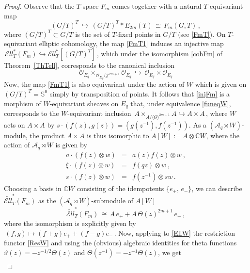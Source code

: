 \documentclass[11pt]{amsart}
\theoremstyle{definition}
\theoremstyle{remark}
\numberwithin{equation}{section}
\newcommand{\la}{\label}
\newcommand{\into}{\hookrightarrow}
\def\bS{\mathbb S}
\def\c{\mathbb{C}}
\def\A{\mathcal{A}}
\def\O{\mathcal{O}}
\def\Ell{\mathcal{E}{ll}}
\begin{document}
\begin{proof}
Observe that the $T$-space $ F_m $  comes together with a natural $T$-equivariant map
%
\begin{equation}
\la{FmT1}
 (G/T)^T \,\into\, (G/T)^T \ast E_{2m}(T)\,\cong\, F_m(G,T)\,,   
\end{equation}
%
where $(G/T)^T \subset G/T $ is the set of $T$-fixed points in $G/T$ (see \eqref{FmT}). On $T$-equivariant elliptic cohomology, the map \eqref{FmT1} induces an injective map $\,\Ell_T^*(F_m) \into \Ell^*_T [(G/T)^T]\,$, which under the isomorphism \eqref{cohFm} of Theorem~\ref{ThTell}, corresponds to the canonical inclusion
%
\begin{equation}
\la{injFm}
 \O_{E_q} \times_{\O_{E_q}/{\mathcal J}^{2m+1}}  \O_{E_q} \,\into\, \O_{E_q} \times \O_{E_q} 
\end{equation}
%
Now, the map \eqref{FmT1} is also equivariant under the action of $W$ which is given on $ (G/T)^T = \bS^0 $  simply by transposition of points.
It follows that \eqref{injFm} is a morphism of $W$-equivariant sheaves on $E_q$ that, under equivalence
\eqref{funeqW}, corresponds to the $W$-equivariant inclusion
$\,A \times_{A/\langle \Theta\rangle^{2m+1} } A \into A \times A \,$, where $W$ acts on $A \times A$ by
$s \cdot (f(z), g(z)) =  (g(z^{-1}), f(z^{-1}))$.
As a $ (\A_q \rtimes W)$-module, the product $ A \times A $ is thus isomorphic to 
$ A[W] := A \otimes \c W $, where the action of $\A_q \rtimes W$ is given by
%
\begin{eqnarray}\la{relAW}
a \cdot (f(z) \otimes w) &=& 
a(z)f(z) \otimes w\ ,\nonumber\\
\xi \cdot (f(z) \otimes w) &=& f(qz) \otimes w\ ,\\
s \cdot (f(z) \otimes w) &=& f(z^{-1}) \otimes sw\,.\nonumber
\end{eqnarray}
%
Choosing a basis in $\c W$ consisting of the idempotents $ \{e_+,\, e_{-}\}$, we can describe $ \widetilde{\Ell}_T^*(F_m) $ as the $(\A_q \rtimes W)$-submodule of $A[W]$ 
%
\begin{equation}
\la{EllW}
 \widetilde{\Ell}_T^* (F_m) \,\cong\, A \,e_{+} + A \,\Theta(z)^{2m+1}\, e_{-}\,, 
\end{equation}
%
where the isomorphism is explicitly given by $\,(f,g) \mapsto (f+g) e_{+} + (f-g) e_{-} \,$. Now, applying to \eqref{EllW} the restriction functor \eqref{ResW} and using the (obvious) algebraic
identities for theta functions $\vartheta(z)= - z^{-1/2} \Theta(z)$ and $\Theta(z^{-1}) = - z^{-1} \Theta(z)$, we get
%
\begin{eqnarray*}

\end{eqnarray*}
\end{proof}
\end{document}

